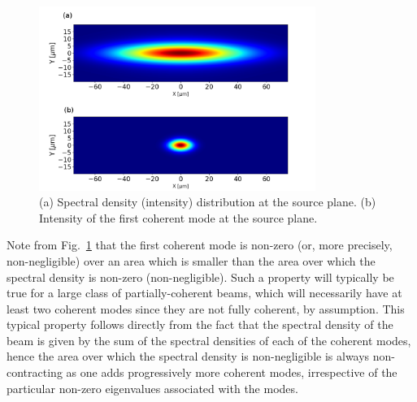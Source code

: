 \documentclass[%
 reprint,
 amsmath,amssymb,
 aps,
]{revtex4-1}
\begin{document}
\begin{figure}%
\includegraphics[width=9.0cm]{Figures/spectral_density.png}
\caption{(a) Spectral density (intensity) distribution at the source plane. (b) Intensity of the first coherent mode at the source plane.}
\label{spectral_density}
\end{figure}

Note from Fig.~\ref{spectral_density} that the first coherent mode is non-zero (or, more precisely, non-negligible) over an area which is smaller than the area over which the spectral density is non-zero (non-negligible). Such a property will typically be true for a large class of partially-coherent beams, which will necessarily have at least two coherent modes since they are not fully coherent, by assumption.  This typical property follows directly from the fact that the spectral density of the beam is given by the sum of the spectral densities of each of the coherent modes, hence the area over which the spectral density is non-negligible is always non-contracting as one adds progressively more coherent modes, irrespective of the particular non-zero eigenvalues associated with the modes.  
\end{document}
